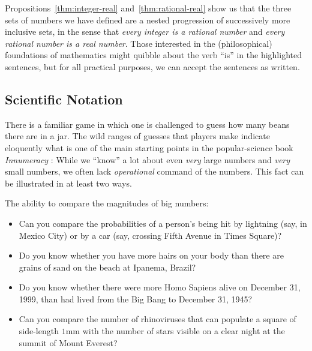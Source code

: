 \bigskip

Propositions~\ref{thm:integer-real} and~\ref{thm:rational-real} show
us that the three sets of numbers we have defined are a nested
progression of successively more inclusive sets, in the sense that
{\em every integer is a rational number} and {\em every rational
  number is a real number}.  Those interested in the (philosophical)
foundations of mathematics might quibble about the verb ``is'' in the
highlighted sentences, but for all practical purposes, we can accept
the sentences as written.



\subsection{Scientific Notation}
\label{sec:scientific-notation}

There is a familiar game in which one is challenged to guess how many
beans there are in a jar. The wild ranges of guesses that players make
indicate eloquently what is one of the main starting points in the
popular-science book {\it Innumeracy} \cite{Paulos}: While we ``know''
a lot about even {\em very} large numbers and {\em very} small
numbers, we often lack {\em operational} command of the numbers.  This
fact can be illustrated in at least two ways.

The ability to compare the magnitudes of big numbers:
\begin{itemize}
\item
Can you compare the probabilities of a person's being hit by lightning
(say, in Mexico City) or by a car (say, crossing Fifth Avenue in Times
Square)?
\item
Do you know whether you have more hairs on your body than there are
grains of sand on the beach at Ipanema, Brazil?
\item

Do you know whether there were more Homo Sapiens alive on December 31,
1999, than had lived from the Big Bang to December 31, 1945?
\item
Can you compare the number of rhinoviruses that can populate a square
of side-length $1$mm with the number of stars visible on a clear night
at the summit of Mount Everest?
\end{itemize}

